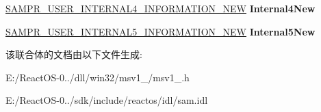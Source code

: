 \begin{DoxyCompactItemize}
\item 
\mbox{\label{union___s_a_m_p_r___u_s_e_r___i_n_f_o___b_u_f_f_e_r_af6617d4089509906b170611d9f1e13ed}} 
\hyperlink{struct___s_a_m_p_r___u_s_e_r___i_n_t_e_r_n_a_l4___i_n_f_o_r_m_a_t_i_o_n___n_e_w}{S\+A\+M\+P\+R\+\_\+\+U\+S\+E\+R\+\_\+\+I\+N\+T\+E\+R\+N\+A\+L4\+\_\+\+I\+N\+F\+O\+R\+M\+A\+T\+I\+O\+N\+\_\+\+N\+EW} {\bfseries Internal4\+New}
\item 
\mbox{\label{union___s_a_m_p_r___u_s_e_r___i_n_f_o___b_u_f_f_e_r_af153457bec2c352e6b6e034b22443c81}} 
\hyperlink{struct___s_a_m_p_r___u_s_e_r___i_n_t_e_r_n_a_l5___i_n_f_o_r_m_a_t_i_o_n___n_e_w}{S\+A\+M\+P\+R\+\_\+\+U\+S\+E\+R\+\_\+\+I\+N\+T\+E\+R\+N\+A\+L5\+\_\+\+I\+N\+F\+O\+R\+M\+A\+T\+I\+O\+N\+\_\+\+N\+EW} {\bfseries Internal5\+New}
\end{DoxyCompactItemize}


该联合体的文档由以下文件生成\+:\begin{DoxyCompactItemize}
\item 
E\+:/\+React\+O\+S-\/0../dll/win32/msv1\+\_/msv1\+\_.\+h\item 
E\+:/\+React\+O\+S-\/0../sdk/include/reactos/idl/sam.\+idl\end{DoxyCompactItemize}
